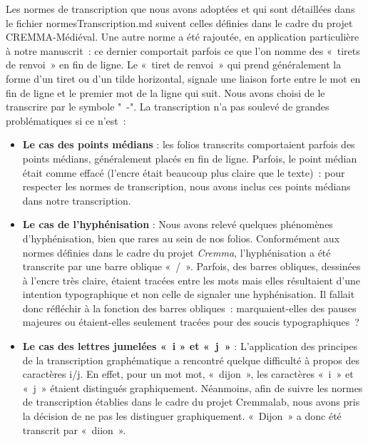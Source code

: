 \documentclass[12pt,a4paper,oneside,titlepage]{article} %
\begin{document}
Les normes de transcription que nous avons adoptées et qui sont détaillées dans le fichier normesTranscription.md suivent celles définies dans le cadre du projet CREMMA-Médiéval. Une autre norme a été rajoutée, en application particulière à notre manuscrit : ce dernier comportait parfois ce que l’on nomme des « tirets de renvoi » en fin de ligne. Le « tiret de renvoi » qui prend  généralement la forme d’un tiret ou d’un tilde horizontal, signale une liaison forte entre le mot en fin de ligne et  le premier mot de la ligne qui suit. Nous avons choisi de le transcrire par le symbole " -".  
La transcription n’a pas soulevé de grandes problématiques si ce n’est :
\begin{itemize}
\item \textbf{Le cas des points médians} :  les folios transcrits comportaient parfois des points médians, généralement placés en fin de ligne. Parfois, le point médian était comme effacé (l’encre était beaucoup plus claire que le texte) : pour respecter les normes de transcription, nous avons inclus ces points médians dans notre transcription.

	\item
	\textbf{Le cas de l’hyphénisation }: 
Nous avons relevé quelques phénomènes d’hyphénisation, bien que rares au sein de nos folios. Conformément aux normes définies dans le cadre du projet \emph{Cremma}, l’hyphénisation a été transcrite par une barre oblique « / ». Parfois, des barres obliques, dessinées à l’encre très claire, étaient tracées entre les mots mais elles résultaient d’une intention typographique et non celle de signaler une hyphénisation. Il fallait donc réfléchir à la fonction des barres obliques : marquaient-elles des pauses majeures ou étaient-elles seulement tracées pour des soucis typographiques ? \\

\item
\textbf{Le cas des lettres jumelées « i » et « j »} : 
 L’application des principes de la transcription graphématique a rencontré quelque difficulté à propos des caractères i/j. En effet, pour un mot mot, « dijon », les caractères « i » et « j » étaient distingués graphiquement. Néanmoins, afin de suivre les normes de transcription établies dans le cadre du projet Cremmalab, nous avons pris la décision de ne pas les distinguer graphiquement. « Dijon » a donc été transcrit par « diion ».\\
 
\end{itemize}
\end{document}
